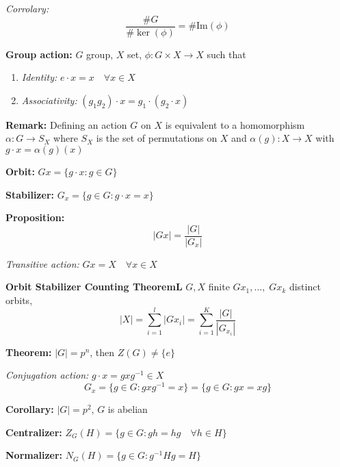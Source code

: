 \documentclass[11pt]{article}
\newcommand{\abs}[1]{\left\vert #1 \right\vert}
\begin{document}
\begin{multicols}{2}
        \emph{Corrolary:}
        \[\frac{\#G}{\#\ker(\phi)} = \#\text{Im}(\phi)\]

        \textbf{Group action:} $G$ group, $X$ set, $\phi: G \times X \to X$ such that 
        \begin{enumerate}
            \item \emph{Identity:} $e \cdot x = x \quad \forall x \in X$
            \item \emph{Associativity:} $(g_1g_2) \cdot x = g_1\cdot (g_2 \cdot x)$
        \end{enumerate}

        \textbf{Remark:} Defining an action $G$ on $X$ is equivalent to a homomorphism $\alpha: G \to S_X$ where $S_X$ is the set of permutations on $X$ and $\alpha(g): X \to X$ with $g\cdot x = \alpha(g)(x)$

        \textbf{Orbit:} $Gx = \{g\cdot x: g \in G\}$

        \textbf{Stabilizer:} $G_x = \{g \in G: g\cdot x = x\}$

        \textbf{Proposition:}
        \[\abs{Gx} = \frac{\abs{G}}{\abs{G_x}}\]

        \emph{Transitive action:} $Gx = X \quad \forall x \in X$

        \textbf{Orbit Stabilizer Counting TheoremL} $G, X$ finite $Gx_1, \dots, \; Gx_k$ distinct orbits, 
        \[\abs{X} = \sum_{i=1}^l \abs{Gx_i} = \sum_{i=1}^K \frac{\abs{G}}{\abs{G_{x_i}}}\]

        \textbf{Theorem:} $\abs{G} = p^n$, then $Z(G) \neq \{e\}$

        \emph{Conjugation action:} $g\cdot x = gxg^{-1} \in X$ 
        \[G_x = \{g\in G: gxg^{-1} = x\} = \{g \in G: gx = xg\}\]

        \textbf{Corollary:} $\abs{G} = p^2$, $G$ is abelian 

        \textbf{Centralizer:} $Z_G(H) = \{g \in G: gh = hg \quad \forall h \in H\}$

        \textbf{Normalizer:} $N_G(H) = \{g\in G: g^{-1}Hg = H\}$


\end{multicols}
\end{document}
